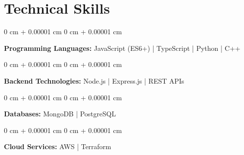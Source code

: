 \documentclass[10pt, letterpaper]{article}
\newenvironment{highlights}{
    \begin{itemize}[
        topsep=0.10 cm,
        parsep=0.10 cm,
        partopsep=0pt,
        itemsep=1pt,
        leftmargin=0 cm + 12pt
    ]
}{
    \end{itemize}
} %
\newenvironment{onecolentry}{
    \begin{adjustwidth}{
        0 cm + 0.00001 cm
    }{
        0 cm + 0.00001 cm
    }
}{
    \end{adjustwidth}
} %
\newenvironment{twocolentry}[2][]{
    \onecolentry
    \def\secondColumn{#2}
    \setcolumnwidth{\fill, 4.5 cm}
    \begin{paracol}{2}
}{
    \switchcolumn \raggedleft \secondColumn
    \end{paracol}
    \endonecolentry
} %
\begin{document}
\section{Technical Skills}
    
    \begin{onecolentry}
        \textbf{Programming Languages:} JavaScript (ES6+) | TypeScript | Python | C++
    \end{onecolentry}
    \vspace{0.1 cm}


    \begin{onecolentry}
        \textbf{Backend Technologies:} Node.js | Express.js | REST APIs 
    \end{onecolentry}
    \vspace{0.1 cm}

    \begin{onecolentry}
        \textbf{Databases:} MongoDB | PostgreSQL
    \end{onecolentry}
    \vspace{0.1 cm}

    \begin{onecolentry}
        \textbf{Cloud Services:} AWS | Terraform
    \end{onecolentry}


    
\end{document}
